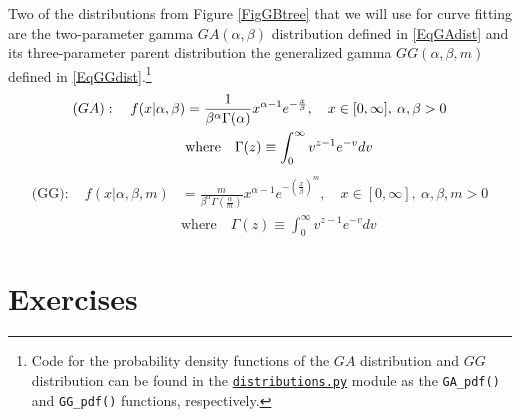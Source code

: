\documentclass[letterpaper,12pt]{article}
\theoremstyle{definition}
\begin{document}
  Two of the distributions from Figure \ref{FigGBtree} that we will use for curve fitting are the two-parameter gamma $GA(\alpha,\beta)$ distribution defined in \eqref{EqGAdist} and its three-parameter parent distribution the generalized gamma $GG(\alpha,\beta,m)$ defined in \eqref{EqGGdist}.\footnote{Code for the probability density functions of the $GA$ distribution and $GG$ distribution can be found in the \href{https://github.com/OpenSourceEcon/DynamicPop/blob/master/code/distributions.py}{\texttt{distributions.py}} module as the \texttt{GA\_pdf()} and \texttt{GG\_pdf()} functions, respectively.}
  \begin{equation}\label{EqGAdist}
    \begin{split}
      \text(GA):\quad f(x|\alpha,\beta) &= \frac{1}{\beta^\alpha \Gamma(\alpha)}x^{\alpha-1}e^{-\frac{x}{\beta}}, \quad x\in[0,\infty],\:\alpha,\beta>0 \\
      &\text{where}\quad \Gamma(z)\equiv \int_0^\infty v^{z-1}e^{-v}dv
    \end{split}
  \end{equation}
  \begin{equation}\label{EqGGdist}
    \begin{split}
      \text{(GG)}:\quad f(x|\alpha,\beta,m) &= \frac{m}{\beta^\alpha \Gamma\left(\frac{\alpha}{m}\right)}x^{\alpha-1}e^{-\left(\frac{x}{\beta}\right)^m}, \quad x\in[0,\infty],\:\alpha,\beta,m>0 \\
      &\text{where}\quad \Gamma(z)\equiv \int_0^\infty v^{z-1}e^{-v}dv
    \end{split}
  \end{equation}


\section{Exercises}\label{SecExercises}

  \renewcommand\theenumi{\alph{enumi}}
\end{document}
